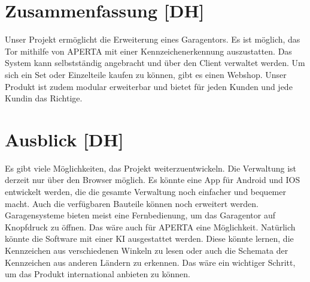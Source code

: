 \section{Zusammenfassung [DH]}
Unser Projekt ermöglicht die Erweiterung eines Garagentors. Es ist möglich, das Tor mithilfe von APERTA mit einer Kennzeichenerkennung auszustatten. Das System kann selbstständig angebracht und über den Client verwaltet werden.
Um sich ein Set oder Einzelteile kaufen zu können, gibt es einen Webshop. 
Unser Produkt ist zudem modular erweiterbar und bietet für jeden Kunden und jede Kundin das Richtige.

\section{Ausblick [DH]}
Es gibt viele Möglichkeiten, das Projekt weiterzuentwickeln. Die Verwaltung ist derzeit nur über den Browser möglich. Es könnte eine App für Android und IOS entwickelt werden, die die gesamte Verwaltung noch einfacher und bequemer macht.
Auch die verfügbaren Bauteile können noch erweitert werden. Garagensysteme bieten meist eine Fernbedienung, um das Garagentor auf Knopfdruck zu öffnen. Das wäre auch für APERTA eine Möglichkeit. 
Natürlich könnte die Software mit einer KI ausgestattet werden. Diese könnte lernen, die Kennzeichen aus verschiedenen Winkeln zu lesen oder auch die Schemata der Kennzeichen aus anderen Ländern zu erkennen. Das wäre ein wichtiger Schritt, um das Produkt international anbieten zu können.
